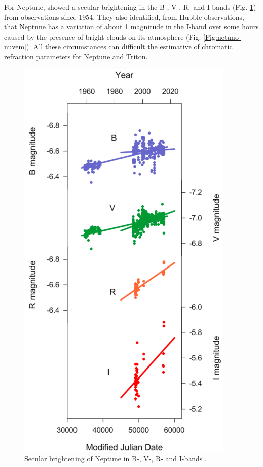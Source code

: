 \documentclass[12pt,a4paper]{report}
\begin{document}
For Neptune, \cite{Schmude2016} showed a secular brightening in the B-, V-, R- and I-bands (Fig. \ref{Fig:netuno-secular}) from observations since 1954. They also identified, from Hubble observations, that Neptune has a variation of about 1 magnitude in the I-band over some hours caused by the presence of bright clouds on its atmosphere (Fig. \ref{Fig:netuno-nuvem}). All these circumstances can difficult the estimative of chromatic refraction parameters for Neptune and Triton.

\begin{figure}[hbtp]
\centering
\includegraphics[scale=1]{Neptune_secular.png}
\caption{Secular brightening of Neptune in B-, V-, R- and I-bands \citep{Schmude2016}. \label{Fig:netuno-secular}}
\end{figure}
\end{document}
